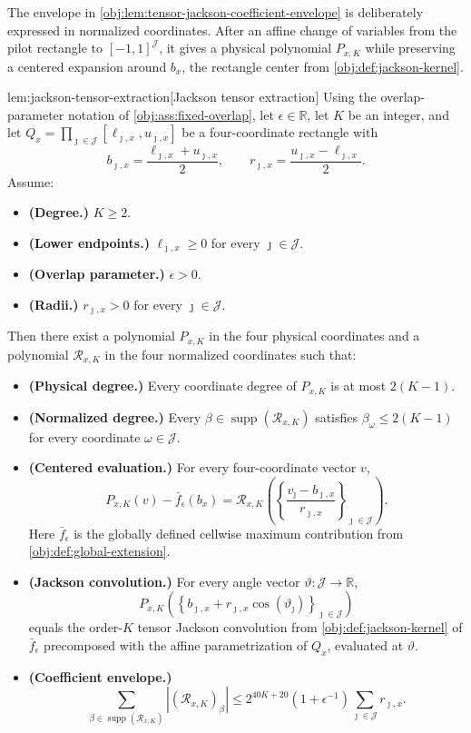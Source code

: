The envelope in \cref{obj:lem:tensor-jackson-coefficient-envelope} is deliberately expressed in normalized coordinates. After an affine change of variables from the pilot rectangle to \([-1,1]^{\mathcal J}\), it gives a physical polynomial \(P_{x,K}\) while preserving a centered expansion around \(b_x\), the rectangle center from \cref{obj:def:jackson-kernel}.

\begin{lemmav}{lem:jackson-tensor-extraction}[Jackson tensor extraction]
Using the overlap-parameter notation of \cref{obj:ass:fixed-overlap}, let \(\epsilon\in\mathbb R\), let \(K\) be an integer, and let
\(Q_x=\prod_{\jmath\in\mathcal J}[\ell_{\jmath,x},u_{\jmath,x}]\) be a four-coordinate rectangle with
\[
b_{\jmath,x}=\frac{\ell_{\jmath,x}+u_{\jmath,x}}{2},
\qquad
r_{\jmath,x}=\frac{u_{\jmath,x}-\ell_{\jmath,x}}{2}.
\]
Assume:
\begin{itemize}
\item \textbf{(Degree.)} \(K\ge 2\).
\item \textbf{(Lower endpoints.)} \(\ell_{\jmath,x}\ge 0\) for every \(\jmath\in\mathcal J\).
\item \textbf{(Overlap parameter.)} \(\epsilon>0\).
\item \textbf{(Radii.)} \(r_{\jmath,x}>0\) for every \(\jmath\in\mathcal J\).
\end{itemize}
Then there exist a polynomial \(P_{x,K}\) in the four physical coordinates and a polynomial
\(\mathcal R_{x,K}\) in the four normalized coordinates such that:
\begin{itemize}
\item \textbf{(Physical degree.)} Every coordinate degree of \(P_{x,K}\) is at most \(2(K-1)\).
\item \textbf{(Normalized degree.)} Every \(\beta\in\operatorname{supp}(\mathcal R_{x,K})\) satisfies
\(\beta_\omega\le 2(K-1)\) for every coordinate \(\omega\in\mathcal J\).
\item \textbf{(Centered evaluation.)} For every four-coordinate vector \(v\),
\[
P_{x,K}(v)-\bar f_\epsilon(b_x)
=
\mathcal R_{x,K}\left(\left\{\frac{v_\jmath-b_{\jmath,x}}{r_{\jmath,x}}\right\}_{\jmath\in\mathcal J}\right).
\]
Here \(\bar f_\epsilon\) is the globally defined cellwise maximum contribution from
\cref{obj:def:global-extension}.
\item \textbf{(Jackson convolution.)} For every angle vector \(\vartheta:\mathcal J\to\mathbb R\),
\[
P_{x,K}\left(\left\{b_{\jmath,x}+r_{\jmath,x}\cos(\vartheta_\jmath)\right\}_{\jmath\in\mathcal J}\right)
\]
equals the order-\(K\) tensor Jackson convolution from \cref{obj:def:jackson-kernel} of
\(\bar f_\epsilon\) precomposed with the affine parametrization of \(Q_x\), evaluated at
\(\vartheta\).
\item \textbf{(Coefficient envelope.)}
\[
\sum_{\beta\in\operatorname{supp}(\mathcal R_{x,K})}
\left|(\mathcal R_{x,K})_\beta\right|
\le
2^{40K+20}(1+\epsilon^{-1})\sum_{\jmath\in\mathcal J}r_{\jmath,x}.
\]
\end{itemize}
\end{lemmav}


